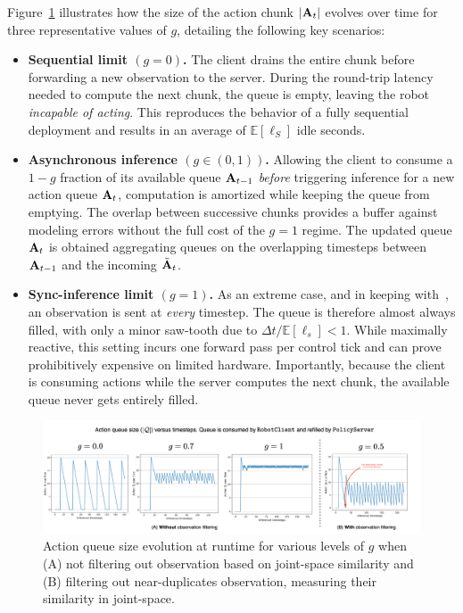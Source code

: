 Figure~\ref{fig:ch4-queues} illustrates how the size of the action chunk \(\lvert \mathbf{A}_t \rvert\) evolves over time for three representative values of \(g\), detailing the following key scenarios:
\begin{itemize}
    \item \textbf{Sequential limit \((g=0)\).} The client drains the entire chunk before forwarding a new observation to the server. During the round-trip latency needed to compute the next chunk, the queue is empty, leaving the robot \emph{incapable of acting}.  This reproduces the behavior of a fully sequential deployment and results in an average of \( \mathbb E[\ell_S] \) idle seconds.
    \item \textbf{Asynchronous inference \((g \in (0,1))\).} Allowing the client to consume a \(1-g\) fraction of its available queue \( \mathbf{A}_{t-1}\) \emph{before} triggering inference for a new action queue \( \mathbf{A}_{t} \), computation is amortized while keeping the queue from emptying. The overlap between successive chunks provides a buffer against modeling errors without the full cost of the \(g=1\) regime. The updated queue \( \mathbf{A}_t\) is obtained aggregating queues on the overlapping timesteps between \( \mathbf{A}_{t-1}\) and the incoming \(\tilde{\mathbf{A}}_{t}\).
    \item \textbf{Sync-inference limit \((g=1)\).}  As an extreme case, and in keeping with~\citet{zhaoLearningFineGrainedBimanual2023}, an observation is sent at \emph{every} timestep. The queue is therefore almost always filled, with only a minor saw-tooth due to \(\Delta t/\mathbb E[\ell_s] < 1\). While maximally reactive, this setting incurs one forward pass per control tick and can prove prohibitively expensive on limited hardware. Importantly, because the client is consuming actions while the server computes the next chunk, the available queue never gets entirely filled.
\end{itemize}

\begin{figure}
    \centering
    \begin{minipage}[t]{0.99\textwidth}
        \centering
        \includegraphics[width=\textwidth]{figures/ch4/ch4-queues.png}
        \caption{Action queue size evolution at runtime for various levels of \( g\) when (A) not filtering out observation based on joint-space similarity and (B) filtering out near-duplicates observation, measuring their similarity in joint-space.}
        \label{fig:ch4-queues}
    \end{minipage}
\end{figure}

